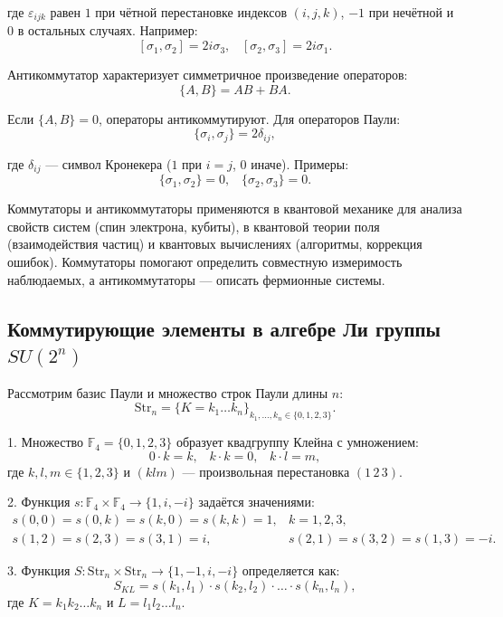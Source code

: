 \documentclass[a4paper]{report}
\begin{document}
\noindent где ${\varepsilon_{ijk}}$ равен $1$ при чётной перестановке индексов ${(i,j,k)}$, $-1$ при нечётной и $0$ в остальных случаях. Например:
$${[\sigma_1, \sigma_2] = 2i\sigma_3,\;\;\; [\sigma_2, \sigma_3] = 2i\sigma_1.}$$

Антикоммутатор характеризует симметричное произведение операторов:
$${\{A, B\} = AB + BA.}$$

\noindent Если ${\{A, B\} = 0}$, операторы антикоммутируют. Для операторов Паули:
$${\{\sigma_i, \sigma_j\} = 2\delta_{ij},}$$

\noindent где ${\delta_{ij}}$ — символ Кронекера ($1$ при ${i = j}$, $0$ иначе). Примеры:
$${\{\sigma_1, \sigma_2\} = 0,\;\;\; \{\sigma_2, \sigma_3\} = 0.}$$

Коммутаторы и антикоммутаторы применяются в квантовой механике для анализа свойств систем (спин электрона, кубиты), в квантовой теории поля (взаимодействия частиц) и квантовых вычислениях (алгоритмы, коррекция ошибок). Коммутаторы помогают определить совместную измеримость наблюдаемых, а антикоммутаторы — описать фермионные системы.


\subsection{Коммутирующие элементы в алгебре Ли группы ${SU(2^{n})}$}

Рассмотрим базис Паули и множество строк Паули длины ${n}$:
$${
    \mathrm{Str}_n = \{K = k_1\ldots k_n\}_{k_1,\ldots,k_n \in \{0,1,2,3\}}.
}$$

1. Множество ${\mathbb{F}_4 = \{0,1,2,3\}}$ образует квадгруппу ${\mbox{Клейна}}$ с умножением:
$${
    0 \cdot k = k,\;\;\;
    k \cdot k = 0,\;\;\;
    k \cdot l = m,
}$$
где ${k,l,m \in \{1,2,3\}}$ и ${(klm)}$ — произвольная перестановка ${(1\,2\,3)}$.

2. Функция ${s: \mathbb{F}_4 \times \mathbb{F}_4 \to \{1, i, -i\}}$ задаётся значениями:
$${
    \begin{array}{ll}
        s(0,0) = s(0,k) = s(k,0) = s(k,k) = 1, & k=1,2,3, \\
        s(1,2) = s(2,3) = s(3,1) = i, & s(2,1) = s(3,2) = s(1,3) = -i.
    \end{array}
}$$

3. Функция ${S: \mathrm{Str}_n \times \mathrm{Str}_n \to \{1, -1, i, -i\}}$ определяется как:
$${
    S_{KL} = s(k_1, l_1) \cdot s(k_2, l_2) \cdot \ldots \cdot s(k_n, l_n),
}$$
где ${K = k_1k_2\ldots k_n}$ и ${L = l_1l_2\ldots l_n}$.
\end{document}
